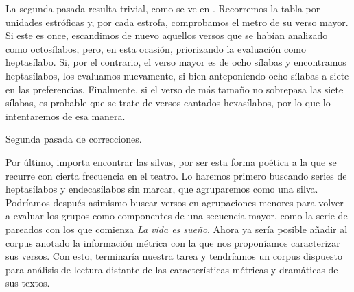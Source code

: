 La segunda pasada resulta trivial, como se ve en . Recorremos la tabla por unidades estróficas y, por cada estrofa, comprobamos el metro de su verso mayor. Si este es once, escandimos de nuevo aquellos versos que se habían analizado como octosílabos, pero, en esta ocasión, priorizando la evaluación como heptasílabo. Si, por el contrario, el verso mayor es de ocho sílabas y encontramos heptasílabos, los evaluamos nuevamente, si bien anteponiendo ocho sílabas a siete en las preferencias. Finalmente, si el verso de más tamaño no sobrepasa las siete sílabas, es probable que se trate de versos cantados hexasílabos, por lo que lo intentaremos de esa manera.

\begin{algorithm}[!ht]
	\caption{Segunda pasada de correcciones.}\label{list:correccion}
	\end{algorithm}\afterpage{\clearpage}

Por último, importa encontrar las silvas, por ser esta forma poética a la que se recurre con cierta frecuencia en el teatro. Lo haremos primero buscando series de heptasílabos y endecasílabos sin marcar, que agruparemos como una silva. Podríamos después asimismo buscar versos en agrupaciones menores para volver a evaluar los grupos como componentes de una secuencia mayor, como la serie de pareados con los que comienza \textit{La vida es sueño}. Ahora ya sería posible añadir al corpus anotado la información métrica con la que nos proponíamos caracterizar sus versos. Con esto, terminaría nuestra tarea y tendríamos un corpus dispuesto para análisis de lectura distante de las características métricas y dramáticas de sus textos.
